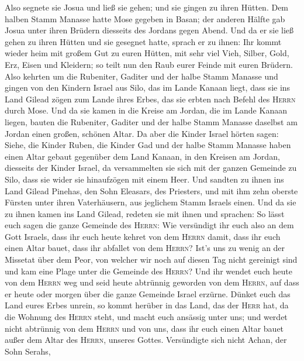  Also segnete sie Josua und ließ sie gehen; und sie gingen
zu ihren Hütten.  Dem halben Stamm Manasse hatte Mose
gegeben in Basan; der anderen Hälfte gab Josua unter ihren Brüdern
diesseits des Jordans gegen Abend. Und da er sie ließ gehen zu ihren
Hütten und sie gesegnet hatte,  sprach er zu ihnen: Ihr
kommt wieder heim mit großem Gut zu euren Hütten, mit sehr viel Vieh,
Silber, Gold, Erz, Eisen und Kleidern; so teilt nun den Raub eurer
Feinde mit euren Brüdern.  Also kehrten um die Rubeniter,
Gaditer und der halbe Stamm Manasse und gingen von den Kindern Israel
aus Silo, das im Lande Kanaan liegt, dass sie ins Land Gilead zögen zum
Lande ihres Erbes, das sie erbten nach Befehl des \textsc{Herrn} durch
Mose.  Und da sie kamen in die Kreise am Jordan, die im
Lande Kanaan liegen, bauten die Rubeniter, Gaditer und der halbe Stamm
Manasse daselbst am Jordan einen großen, schönen Altar. 
Da aber die Kinder Israel hörten sagen: Siehe, die Kinder Ruben, die
Kinder Gad und der halbe Stamm Manasse haben einen Altar gebaut
gegenüber dem Land Kanaan, in den Kreisen am Jordan, diesseits der
Kinder Israel,  da versammelten sie sich mit der ganzen
Gemeinde zu Silo, dass sie wider sie hinaufzögen mit einem Heer.
 Und sandten zu ihnen ins Land Gilead Pinehas, den Sohn
Eleasars, des Priesters,  und mit ihm zehn oberste
Fürsten unter ihren Vaterhäusern, aus jeglichem Stamm Israels einen.
 Und da sie zu ihnen kamen ins Land Gilead, redeten sie
mit ihnen und sprachen:  So lässt euch sagen die ganze
Gemeinde des \textsc{Herrn}: Wie versündigt ihr euch also an dem Gott
Israels, dass ihr euch heute kehret von dem \textsc{Herrn} damit, dass
ihr euch einen Altar bauet, dass ihr abfallet von dem \textsc{Herrn}?
 Ist's uns zu wenig an der Missetat über dem Peor, von
welcher wir noch auf diesen Tag nicht gereinigt sind und kam eine Plage
unter die Gemeinde des \textsc{Herrn}?  Und ihr wendet
euch heute von dem \textsc{Herrn} weg und seid heute abtrünnig geworden
von dem \textsc{Herrn}, auf dass er heute oder morgen über die ganze
Gemeinde Israel erzürne.  Dünket euch das Land eures
Erbes unrein, so kommt herüber in das Land, das der \textsc{Herr} hat,
da die Wohnung des \textsc{Herrn} steht, und macht euch ansässig unter
uns; und werdet nicht abtrünnig von dem \textsc{Herrn} und von uns, dass
ihr euch einen Altar bauet außer dem Altar des \textsc{Herrn}, unseres
Gottes.  Versündigte sich nicht Achan, der Sohn Serahs,
